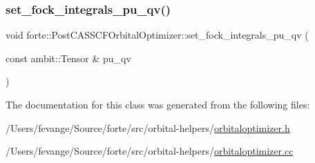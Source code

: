 \subsubsection{\texorpdfstring{set\+\_\+fock\+\_\+integrals\+\_\+pu\+\_\+qv()}{set\_fock\_integrals\_pu\_qv()}}
{\footnotesize\ttfamily void forte\+::\+Post\+C\+A\+S\+S\+C\+F\+Orbital\+Optimizer\+::set\+\_\+fock\+\_\+integrals\+\_\+pu\+\_\+qv (\begin{DoxyParamCaption}\item[{const ambit\+::\+Tensor \&}]{pu\+\_\+qv }\end{DoxyParamCaption})\hspace{0.3cm}{\ttfamily [inline]}}



The documentation for this class was generated from the following files\+:\begin{DoxyCompactItemize}
\item 
/\+Users/fevange/\+Source/forte/src/orbital-\/helpers/\mbox{\hyperlink{orbitaloptimizer_8h}{orbitaloptimizer.\+h}}\item 
/\+Users/fevange/\+Source/forte/src/orbital-\/helpers/\mbox{\hyperlink{orbitaloptimizer_8cc}{orbitaloptimizer.\+cc}}\end{DoxyCompactItemize}
